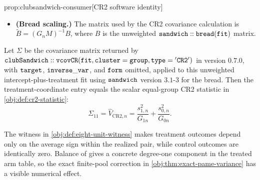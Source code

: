 \documentclass[11pt]{article}
\begin{document}
\begin{propositionv}{prop:clubsandwich-consumer}[CR2 software identity]
\begin{itemize}
\[
A_gA_g(I-H_g)=I.
\]
\item \textbf{(Bread scaling.)} The matrix used by the CR2 covariance calculation is \(\widetilde B=(G_nM)^{-1}B\), where \(B\) is the unweighted \({\tt sandwich::bread}({\tt fit})\) matrix.
\end{itemize}
Let \(\Sigma\) be the covariance matrix returned by \({\tt clubSandwich::vcovCR}({\tt fit}, {\tt cluster}={\tt group}, {\tt type}={\tt 'CR2'})\) in version \(0.7.0\), with \({\tt target}\), \({\tt inverse\_var}\), and \({\tt form}\) omitted, applied to this unweighted intercept-plus-treatment fit using \({\tt sandwich}\) version \(3.1\text{-}3\) for the bread.  Then the treatment-coordinate entry equals the scalar equal-group CR2 statistic in \cref{obj:def:cr2-statistic}:
\[
\Sigma_{11}
=
\widehat V_{\mathrm{CR2},n}
=
\frac{s_{1,n}^2}{G_{1n}}+\frac{s_{0,n}^2}{G_{0n}}.
\]
\end{propositionv}

The witness in \cref{obj:def:eight-unit-witness} makes treatment outcomes depend only on the average sign within the realized pair, while control outcomes are identically zero. Balance of  gives a concrete degree-one component in the treated arm table, so the exact finite-pool correction in \cref{obj:thm:exact-pame-variance} has a visible numerical effect.
\end{document}
